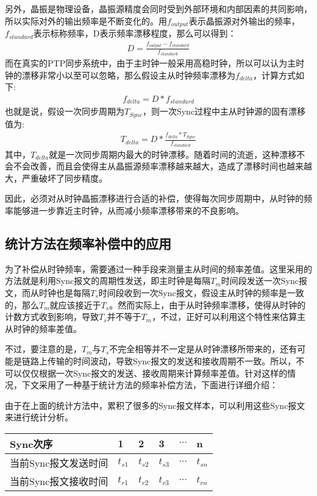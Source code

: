 另外，晶振是物理设备，晶振源精度会同时受到外部环境和内部因素的共同影响，所以实际对外的输出频率是不断变化的。用$f_{output}$表示晶振源对外输出的频率，$f_{standard}$表示标称频率，D表示频率漂移程度，那么可以得到：
\begin {align}
D = \frac{f_{output} - f_{standard}}{f_{standard}}
\end{align}
而在真实的PTP同步系统中，由于主时钟一般采用高稳时钟，所以可以认为主时钟的漂移非常小以至可以忽略，那么假设主从时钟频率漂移为$f_{delta}$，计算方式如下:
\begin {align}
f_{delta} = D * f_{standard}
\end{align}
也就是说，假设一次同步周期为$T_{Sync}$，则一次Sync过程中主从时钟源的固有漂移值为:
\begin {align}
T_{delta} = D * \frac{f_{delta} * T_{Sync}}{f_{standard}}
\end{align}
其中，$T_{delta}$就是一次同步周期内最大的时钟漂移。随着时间的流逝，这种漂移不会不会改善，而且会使得主从晶振源频率漂移越来越大，造成了漂移时间也越来越大，严重破坏了同步精度。

因此，必须对从时钟晶振漂移进行合适的补偿，使得每次同步周期中，从时钟的频率能够进一步靠近主时钟，从而减小频率漂移带来的不良影响。

\subsection{统计方法在频率补偿中的应用}
为了补偿从时钟频率，需要通过一种手段来测量主从时间的频率差值。这里采用的方法就是利用Sync报文的周期性发送，即主时钟是每隔$T_{m}$时间段发送一次Sync报文，而从时钟也是每隔$T_{s}$时间段收到一次Sync报文，假设主从时钟的频率是一致的，那么$T_{m}$就应该接近于$T_{s}$。然而实际上，由于从时钟频率漂移，使得从时钟的计数方式收到影响，导致$T_{s}$并不等于$T_{m}$，不过，正好可以利用这个特性来估算主从时钟的频率差值。

不过，要注意的是，$T_{m}$与$T_{s}$不完全相等并不一定是从时钟漂移所带来的，还有可能是链路上传输的时间波动，导致Sync报文的发送和接收周期不一致。所以，不可以仅仅根据一次Sync报文的发送、接收周期来计算频率差值。针对这样的情况，下文采用了一种基于统计方法的频率补偿方法，下面进行详细介绍：

由于在上面的统计方法中，累积了很多的Sync报文样本，可以利用这些Sync报文来进行统计分析。
\begin{table}[htpb]
  \centering
  \begin{tabular}{llllll} \toprule
    Sync次序 & 1 & 2 & 3 & $\cdots$ & n \\ \midrule
    当前Sync报文发送时间 & $t_{s1}$ & $t_{s2}$ & $t_{s3}$ & $\cdots$ & $t_{sn}$ \\ \midrule
    当前Sync报文接收时间 & $t_{r1}$ & $t_{r2}$ & $t_{r3}$ & $\cdots$ & $t_{rn}$  \\ \bottomrule
  \end{tabular}
\end{table}

